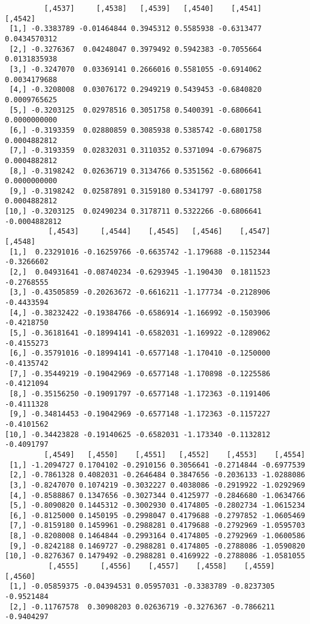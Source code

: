 \documentclass[
  letterpaper,
  DIV=11,
  numbers=noendperiod]{scrreprt}
\begin{document}
\begin{verbatim}
         [,4537]     [,4538]   [,4539]   [,4540]    [,4541]       [,4542]
 [1,] -0.3383789 -0.01464844 0.3945312 0.5585938 -0.6313477  0.0434570312
 [2,] -0.3276367  0.04248047 0.3979492 0.5942383 -0.7055664  0.0131835938
 [3,] -0.3247070  0.03369141 0.2666016 0.5581055 -0.6914062  0.0034179688
 [4,] -0.3208008  0.03076172 0.2949219 0.5439453 -0.6840820  0.0009765625
 [5,] -0.3203125  0.02978516 0.3051758 0.5400391 -0.6806641  0.0000000000
 [6,] -0.3193359  0.02880859 0.3085938 0.5385742 -0.6801758  0.0004882812
 [7,] -0.3193359  0.02832031 0.3110352 0.5371094 -0.6796875  0.0004882812
 [8,] -0.3198242  0.02636719 0.3134766 0.5351562 -0.6806641  0.0000000000
 [9,] -0.3198242  0.02587891 0.3159180 0.5341797 -0.6801758  0.0004882812
[10,] -0.3203125  0.02490234 0.3178711 0.5322266 -0.6806641 -0.0004882812
          [,4543]     [,4544]    [,4545]   [,4546]    [,4547]    [,4548]
 [1,]  0.23291016 -0.16259766 -0.6635742 -1.179688 -0.1152344 -0.3266602
 [2,]  0.04931641 -0.08740234 -0.6293945 -1.190430  0.1811523 -0.2768555
 [3,] -0.43505859 -0.20263672 -0.6616211 -1.177734 -0.2128906 -0.4433594
 [4,] -0.38232422 -0.19384766 -0.6586914 -1.166992 -0.1503906 -0.4218750
 [5,] -0.36181641 -0.18994141 -0.6582031 -1.169922 -0.1289062 -0.4155273
 [6,] -0.35791016 -0.18994141 -0.6577148 -1.170410 -0.1250000 -0.4135742
 [7,] -0.35449219 -0.19042969 -0.6577148 -1.170898 -0.1225586 -0.4121094
 [8,] -0.35156250 -0.19091797 -0.6577148 -1.172363 -0.1191406 -0.4111328
 [9,] -0.34814453 -0.19042969 -0.6577148 -1.172363 -0.1157227 -0.4101562
[10,] -0.34423828 -0.19140625 -0.6582031 -1.173340 -0.1132812 -0.4091797
         [,4549]   [,4550]    [,4551]   [,4552]    [,4553]    [,4554]
 [1,] -1.2094727 0.1704102 -0.2910156 0.3056641 -0.2714844 -0.6977539
 [2,] -0.7861328 0.4082031 -0.2646484 0.3847656 -0.2036133 -1.0288086
 [3,] -0.8247070 0.1074219 -0.3032227 0.4038086 -0.2919922 -1.0292969
 [4,] -0.8588867 0.1347656 -0.3027344 0.4125977 -0.2846680 -1.0634766
 [5,] -0.8090820 0.1445312 -0.3002930 0.4174805 -0.2802734 -1.0615234
 [6,] -0.8125000 0.1450195 -0.2998047 0.4179688 -0.2797852 -1.0605469
 [7,] -0.8159180 0.1459961 -0.2988281 0.4179688 -0.2792969 -1.0595703
 [8,] -0.8208008 0.1464844 -0.2993164 0.4174805 -0.2792969 -1.0600586
 [9,] -0.8242188 0.1469727 -0.2988281 0.4174805 -0.2788086 -1.0590820
[10,] -0.8276367 0.1479492 -0.2988281 0.4169922 -0.2788086 -1.0581055
          [,4555]     [,4556]    [,4557]    [,4558]    [,4559]    [,4560]
 [1,] -0.05859375 -0.04394531 0.05957031 -0.3383789 -0.8237305 -0.9521484
 [2,] -0.11767578  0.30908203 0.02636719 -0.3276367 -0.7866211 -0.9404297

\end{verbatim}
\end{document}
